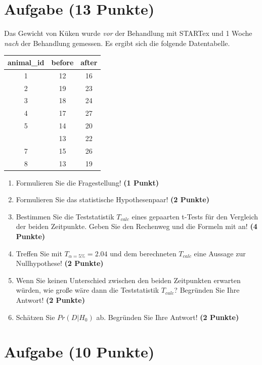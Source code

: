 \documentclass[a4paper, 10pt]{scrartcl}\usepackage[]{graphicx}\usepackage[]{xcolor}
\begin{document}
\section{Aufgabe \hfill (13 Punkte)}

Das Gewicht von K{\"u}ken wurde \textit{vor} der Behandlung mit STARTex und 1
Woche \textit{nach} der Behandlung gemessen. Es ergibt sich die folgende
Datentabelle.

\begin{table}[!h]
\centering
\begin{tabular}{ccc}
\toprule
animal\_id & before & after\\
\midrule
1 & 12 & 16\\
2 & 19 & 23\\
3 & 18 & 24\\
4 & 17 & 27\\
5 & 14 & 20\\
\addlinespace
6 & 13 & 22\\
7 & 15 & 26\\
8 & 13 & 19\\
\bottomrule
\end{tabular}
\end{table}



\begin{enumerate}
\item Formulieren Sie die Fragestellung! \textbf{(1 Punkt)}
\item Formulieren Sie das statistische Hypothesenpaar! \textbf{(2
    Punkte)}
\item Bestimmen Sie die Teststatistik $T_{calc}$ eines gepaarten t-Tests f{\"u}r den
  Vergleich der beiden Zeitpunkte. Geben Sie den Rechenweg und die Formeln
  mit an! \textbf{(4 Punkte)}
\item Treffen Sie mit $T_{\alpha = 5\%} = 2.04$ und dem berechneten $T_{calc}$ eine Aussage
  zur Nullhypothese! \textbf{(2 Punkte)}
\item Wenn Sie keinen Unterschied zwischen den beiden Zeitpunkten erwarten
  w{\"u}rden, wie gro{\ss}e w{\"a}re dann die Teststatistik $T_{calc}$? Begr{\"u}nden Sie Ihre
  Antwort! \textbf{(2 Punkte)}
\item Sch{\"a}tzen Sie $Pr(D|H_0)$ ab. Begr{\"u}nden Sie Ihre Antwort! \textbf{(2
    Punkte)}
\end{enumerate} 
\clearpage

\section{Aufgabe \hfill (10 Punkte)}
\end{document}

